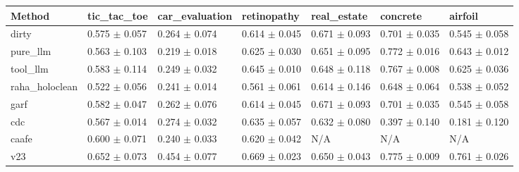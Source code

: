 \begin{tabular}{lllllll}
\hline
Method & tic_tac_toe & car_evaluation & retinopathy & real_estate & concrete & airfoil \\
\hline
dirty & 0.575 $\pm$ 0.057 & 0.264 $\pm$ 0.074 & 0.614 $\pm$ 0.045 & 0.671 $\pm$ 0.093 & 0.701 $\pm$ 0.035 & 0.545 $\pm$ 0.058 \\
pure\_llm & 0.563 $\pm$ 0.103 & 0.219 $\pm$ 0.018 & 0.625 $\pm$ 0.030 & 0.651 $\pm$ 0.095 & 0.772 $\pm$ 0.016 & 0.643 $\pm$ 0.012 \\
tool\_llm & 0.583 $\pm$ 0.114 & 0.249 $\pm$ 0.032 & 0.645 $\pm$ 0.010 & 0.648 $\pm$ 0.118 & 0.767 $\pm$ 0.008 & 0.625 $\pm$ 0.036 \\
raha\_holoclean & 0.522 $\pm$ 0.056 & 0.241 $\pm$ 0.014 & 0.561 $\pm$ 0.061 & 0.614 $\pm$ 0.146 & 0.648 $\pm$ 0.064 & 0.538 $\pm$ 0.052 \\
garf & 0.582 $\pm$ 0.047 & 0.262 $\pm$ 0.076 & 0.614 $\pm$ 0.045 & 0.671 $\pm$ 0.093 & 0.701 $\pm$ 0.035 & 0.545 $\pm$ 0.058 \\
cdc & 0.567 $\pm$ 0.014 & 0.274 $\pm$ 0.032 & 0.635 $\pm$ 0.057 & 0.632 $\pm$ 0.080 & 0.397 $\pm$ 0.140 & 0.181 $\pm$ 0.120 \\
caafe & 0.600 $\pm$ 0.071 & 0.240 $\pm$ 0.033 & 0.620 $\pm$ 0.042 & N/A & N/A & N/A \\
v23 & 0.652 $\pm$ 0.073 & 0.454 $\pm$ 0.077 & 0.669 $\pm$ 0.023 & 0.650 $\pm$ 0.043 & 0.775 $\pm$ 0.009 & 0.761 $\pm$ 0.026 \\
\hline
\end{tabular}
